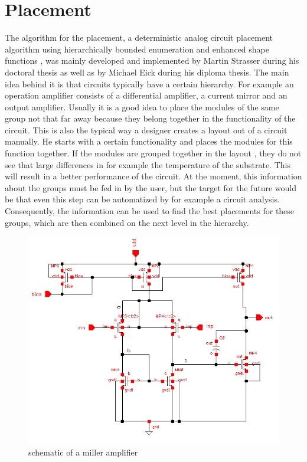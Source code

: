 \chapter{Placement}
The algorithm for the placement, a deterministic analog circuit placement algorithm using hierarchically bounded enumeration and enhanced shape functions \cite{iccad:plantage}, was mainly developed and implemented by Martin Strasser during his doctoral thesis as well as by Michael Eick during his diploma thesis. The main idea behind it is that circuits typically have a certain hierarchy. For example an operation amplifier  consists of a differential amplifier, a current mirror and an output amplifier. Usually it is a good idea to place the modules of the same group not that far away because they belong together in the functionality of the circuit. This is also the typical way a designer creates a layout out of a circuit manually. He starts with a certain functionality and places the modules for this function together. If the modules are grouped together in the layout , they do not see that large differences in for example the temperature of the substrate. This will result in a better performance of the circuit.
At the moment, this information about the groups must be fed in by the user, but the target for the future would be that even this step can be automatized by for example a circuit analysis. Consequently, the information can be used to find the best placements for these groups, which are then combined on the next level in the hierarchy.

\begin{figure}
	\centering
	\includegraphics[scale=0.6]{FIG/miller_amplifier_schematic.png}
	\caption{schematic of a miller amplifier}
	\label{fig:miller_amplifier_schematic}
\end{figure}

